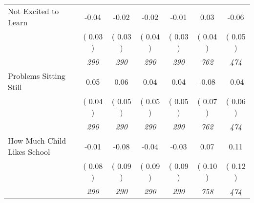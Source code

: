 \begin{tabular}{l c c c c c c}
Not Excited to Learn &     -0.04 &     -0.02 &     -0.02 &     -0.01 &      0.03 &     -0.06 \\
& (     0.03 ) & (     0.03 ) & (     0.04 ) & (     0.03 ) & (     0.04 ) & (     0.05 ) \\
& \textit{ 290 } & \textit{ 290 } & \textit{ 290 } & \textit{ 290 } & \textit{ 762 } & \textit{ 474 } \\
Problems Sitting Still &      0.05 &      0.06 &      0.04 &      0.04 &     -0.08 &     -0.04 \\
& (     0.04 ) & (     0.05 ) & (     0.05 ) & (     0.05 ) & (     0.07 ) & (     0.06 ) \\
& \textit{ 290 } & \textit{ 290 } & \textit{ 290 } & \textit{ 290 } & \textit{ 762 } & \textit{ 474 } \\
How Much Child Likes School &     -0.01 &     -0.08 &     -0.04 &     -0.03 &      0.07 &      0.11 \\
& (     0.08 ) & (     0.09 ) & (     0.09 ) & (     0.09 ) & (     0.10 ) & (     0.12 ) \\
& \textit{ 290 } & \textit{ 290 } & \textit{ 290 } & \textit{ 290 } & \textit{ 758 } & \textit{ 474 } \\
\bottomrule
\end{tabular}
